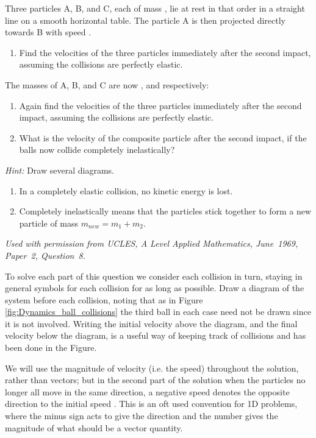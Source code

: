 
\begin{problem}[A1969AMIIQ8l] %
{Three particles A, B, and C, each of mass , lie at rest in that order in a straight line on a smooth horizontal table. The particle A is then projected directly towards B with speed . 
\begin{enumerate}
	\item Find the velocities of the three particles immediately after the second impact, assuming the collisions are perfectly elastic.
\end{enumerate}
The masses of A, B, and C are now ,  and  respectively:
\begin{enumerate}[resume]
	\item Again find the velocities of the three particles immediately after the second impact, assuming the collisions are perfectly elastic.
	\item What is the velocity of the composite particle after the second impact, if the balls now collide completely inelastically?
\end{enumerate}

\emph{Hint:} Draw several diagrams.
\begin{enumerate}
	\item In a completely elastic collision, no kinetic energy is lost.
	\item Completely inelastically means that the particles stick together to form a new particle of mass $m_{new}={m_{1} + m_2}$.
\end{enumerate}
}
{\textit{Used with permission from UCLES, A Level Applied Mathematics, June~1969, Paper~2, Question~8.}}
{To solve each part of this question we consider each collision in turn, staying in general symbols for each collision for as long as possible. Draw a diagram of the system before each collision, noting that as in Figure \ref{fig:Dynamics_ball_collisions} the third ball in each case need not be drawn since it is not involved. Writing the initial velocity above the diagram, and the final velocity below the diagram, is a useful way of keeping track of collisions and has been done in the Figure. 

We will use the magnitude of velocity (i.e. the speed) throughout the solution, rather than vectors; but in the second part of the solution when the particles no longer all move in the same direction, a negative speed denotes the opposite direction to the initial speed . This is an oft used convention for 1D problems, where the minus sign acts to give the direction and the number gives the magnitude of what should be a vector quantity.

}
\end{problem}
